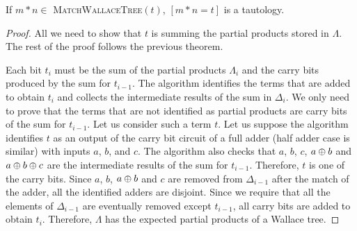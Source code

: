 \begin{thm}
  If $m*n\in$ \textsc{MatchWallaceTree}$(t)$, $[m*n = t]$ is a tautology.
\end{thm}
\begin{proof}
  All we need to show that $t$ is summing the partial products stored in
  $\Lambda$.
  The rest of the proof follows the previous theorem.

  Each bit $t_i$ must be the sum of the partial products $\Lambda_i$ and 
  the carry bits produced by the sum for $t_{i-1}$.
  The algorithm identifies the terms that are added to obtain $t_i$
  and collects the intermediate results of the sum in $\Delta_{i}$.
  We only need to prove that the terms that are not identified as
  partial products are carry bits of the sum for $t_{i-1}$.
  Let us consider such a term $t$.
  Let us suppose the algorithm identifies $t$ as an output of the carry
  bit circuit of a full adder (half adder case is similar) with inputs
  $a$, $b$, and $c$.
  The algorithm also checks that $a$, $b$, $c$, $a \oplus b$ and
  $a \oplus b \oplus c$ are the intermediate
  results of the sum for $t_{i-1}$.
  Therefore, $t$ is one of the carry bits.
  Since $a$, $b$, $a \oplus b$ and $c$ are removed from $\Delta_{i-1}$
  after the match of the adder,
  all the identified adders are disjoint.
  Since we require that all the elements of $\Delta_{i-1}$  are eventually
  removed except $t_{i-1}$, all carry bits are added to obtain $t_i$.
  Therefore, $\Lambda$ has the expected partial products of a Wallace tree.
\end{proof}


